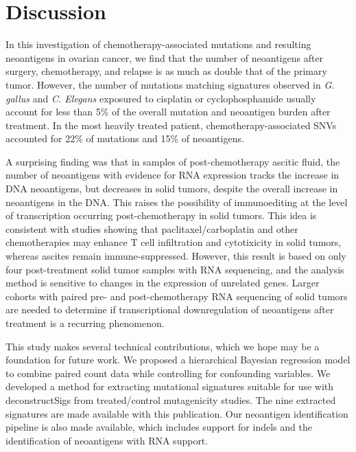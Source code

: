 \section*{Discussion}

In this investigation of chemotherapy-associated mutations and resulting neoantigens in ovarian cancer, we find that the number of neoantigens after surgery, chemotherapy, and relapse is as much as double that of the primary tumor. However, the number of mutations matching signatures observed in \textit{G. gallus} and \textit{C. Elegans} exposured to cisplatin or cyclophosphamide usually account for less than 5\% of the overall mutation and neoantigen burden after treatment. In the most heavily treated patient, chemotherapy-associated SNVs accounted for 22\% of mutations and 15\% of neoantigens.

A surprising finding was that in samples of post-chemotherapy ascitic fluid, the number of neoantigens with evidence for RNA expression tracks the increase in DNA neoantigens, but decreases in solid tumors, despite the overall increase in neoantigens in the DNA. This raises the possibility of immunoediting\cite{Dunn_2002} at the level of transcription occurring post-chemotherapy in solid tumors. This idea is consistent with studies showing that paclitaxel/carboplatin and other chemotherapies may enhance T cell infiltration and cytotixicity in solid tumors\cite{Demaria2001,Wu_2009,Pfannenstiel_2010,Hodge_2013}, whereas ascites remain immune-suppressed\cite{Giuntoli2009,Simpson-Abelson2013,Singel2016}. However, this result is based on only four post-treatment solid tumor samples with RNA sequencing, and the analysis method is sensitive to changes in the expression of unrelated genes. Larger cohorts with paired pre- and post-chemotherapy RNA sequencing of solid tumors are needed to determine if transcriptional downregulation of neoantigens after treatment is a recurring phenomenon.

This study makes several technical contributions, which we hope may be a foundation for future work. We proposed a hierarchical Bayesian regression model to combine paired count data while controlling for confounding variables. We developed a method for extracting mutational signatures suitable for use with deconstructSigs from treated/control mutagenicity studies. The nine extracted signatures are made available with this publication. Our neoantigen identification pipeline is also made available, which includes support for indels and the identification of neoantigens with RNA support. 

